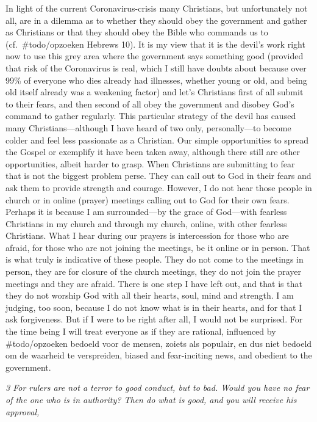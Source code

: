 In light of the current Coronavirus-crisis many Christians, but
unfortunately not all, are in a dilemma as to whether they should obey
the government and gather as Christians or that they should obey the
Bible who commands us to (cf.~\#todo/opzoeken Hebrews 10). It is my view
that it is the devil's work right now to use this grey area where the
government says something good (provided that risk of the Coronavirus is
real, which I still have doubts about because over 99\% of everyone who
dies already had illnesses, whether young or old, and being old itself
already was a weakening factor) and let's Christians first of all submit
to their fears, and then second of all obey the government and disobey
God's command to gather regularly. This particular strategy of the devil
has caused many Christians---although I have heard of two only,
personally---to become colder and feel less passionate as a Christian.
Our simple opportunities to spread the Gospel or exemplify it have been
taken away, although there still are other opportunities, albeit harder
to grasp. When Christians are submitting to fear that is not the biggest
problem perse. They can call out to God in their fears and ask them to
provide strength and courage. However, I do not hear those people in
church or in online (prayer) meetings calling out to God for their own
fears. Perhaps it is because I am surrounded---by the grace of
God---with fearless Christians in my church and through my church,
online, with other fearless Christians. What I hear during our prayers
is intercession for those who are afraid, for those who are not joining
the meetings, be it online or in person. That is what truly is
indicative of these people. They do not come to the meetings in person,
they are for closure of the church meetings, they do not join the prayer
meetings and they are afraid. There is one step I have left out, and
that is that they do not worship God with all their hearts, soul, mind
and strength. I am judging, too soon, because I do not know what is in
their hearts, and for that I ask forgiveness. But if I were to be right
after all, I would not be surprised. For the time being I will treat
everyone as if they are rational, influenced by \#todo/opzoeken bedoeld
voor de mensen, zoiets als populair, en dus niet bedoeld om de waarheid
te verspreiden, biased and fear-inciting news, and obedient to the
government.

\emph{3 For rulers are not a terror to good conduct, but to bad. Would
you have no fear of the one who is in authority? Then do what is good,
and you will receive his approval,}

